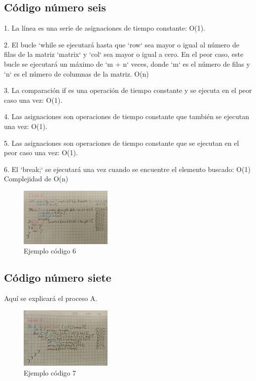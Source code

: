 \documentclass[journal, spanish]{IEEEtran}
\begin{document}
\subsection{Código número seis}
1. La línea es una serie de asignaciones de tiempo constante: O(1).

2. El bucle `while se ejecutará hasta que `row` sea mayor o igual al número de filas de la matriz `matrix` y `col` sea mayor o igual a cero. En el peor caso, este bucle se ejecutará un máximo de `m + n` veces, donde `m` es el número de filas y `n` es el número de columnas de la matriz. O(n)

3. La comparación if es una operación de tiempo constante y se ejecuta en el peor caso una vez: O(1).

4. Las asignaciones  son operaciones de tiempo constante que también se ejecutan una vez: O(1).

5. Las asignaciones son operaciones de tiempo constante que se ejecutan en el peor caso una vez: O(1).

6. El `break;` se ejecutará una vez cuando se encuentre el elemento buscado: O(1)\\

Complejidad de O(n)

\begin{figure}[H]
  \centering
  \includegraphics[width=0.4\textwidth]{WhatsApp Image 2023-09-11 at 8.00.24 PM.jpeg}
  \caption{Ejemplo código 6}
  \label{fig:imagen1}
\end{figure}


\subsection{Código número siete}
Aquí se explicará el proceso A.

\begin{figure}[H]
  \centering
  \includegraphics[width=0.4\textwidth]{WhatsApp Image 2023-09-11 at 8.00.43 PM.jpeg}
  \caption{Ejemplo código 7}
  \label{fig:imagen1}
\end{figure}
\end{document}
